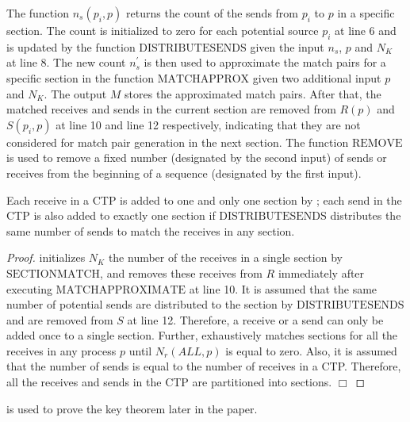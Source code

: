 The function $\mathit{n_s}(p_{i},p)$ returns the count of the  sends from $p_i$ to $p$ in a specific section. The count is initialized to zero for each potential source $p_i$ at line 6 and is updated by the function $\mathrm{DISTRIBUTESENDS}$ given the input $n_s$, $p$ and $N_K$ at line 8. The new count $n_s^\prime$ is then used to approximate the match pairs for a specific section in the function $\mathrm{MATCHAPPROX}$ given two additional input $p$ and $N_K$.
The output $M$ stores the approximated match pairs. After that, the matched receives and sends in the current section are removed from $R(p)$ and $S(p_i,p)$ at line 10 and line 12 respectively, indicating that they are not considered for match pair generation in the next section. The function $\mathrm{REMOVE}$ is used to remove a fixed number (designated by the second input) of sends or receives from the beginning of a sequence (designated by the first input). 
\begin{lemma}
\label{lemma:section}
Each receive in a CTP is added to one and only one section by ; each send in the CTP is also added to exactly one section if $\mathrm{DISTRIBUTESENDS}$ distributes the same number of sends to match the receives in any section.
\end{lemma}
\begin{proof}
 initializes $N_K$ the number of the receives in a single section by $\mathrm{SECTIONMATCH}$, and removes these receives from $R$ immediately after executing $\mathrm{MATCHAPPROXIMATE}$ at line 10. It is assumed that the same number of potential sends are distributed to the section by $\mathrm{DISTRIBUTESENDS}$ and are removed from $S$ at line 12. Therefore, a receive or a send can only be added once to a single section. 
Further,  exhaustively matches sections for all the receives in any process $p$ until $N_r(ALL,p)$ is equal to zero. Also, it is assumed that the number of sends is equal to the number of receives in a CTP. 
Therefore, all the receives and sends in the CTP are partitioned into sections. 
$\Box$
\end{proof}
 is used to prove the key theorem later in the paper.



